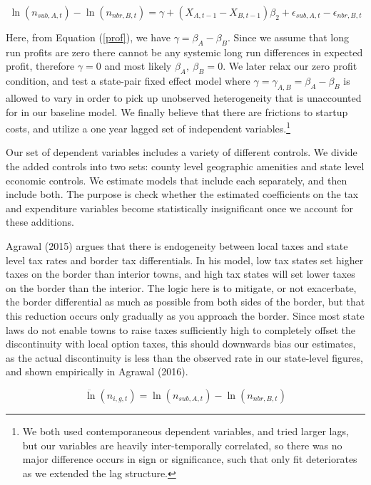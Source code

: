 \documentclass[12pt,a4paper]{article}
\begin{document}
\begin{equation}\label{pref}
\ln(n_{sub,A,t})-\ln(n_{nbr,B,t}) = \gamma+ (X_{A,t-1}-X_{B,t-1})\beta_{2} + \epsilon_{sub,A,t}-\epsilon_{nbr,B,t}
\end{equation}

Here, from Equation (\ref{prof}), we have $\gamma = \beta_{A} - \beta_{B}$. Since we assume that long run profits are zero there cannot be any systemic long run differences in expected profit, therefore $\gamma = 0$ and most likely $\beta_{A},\ \beta_{B} = 0$. We later relax our zero profit condition, and test a state-pair fixed effect model where $\gamma = \gamma_{A,B} = \beta_{A} - \beta_{B}$ is allowed to vary in order to pick up unobserved heterogeneity that is unaccounted for in our baseline model. We finally believe that there are frictions to startup costs, and utilize a one year lagged set of independent variables.\footnote{We both used contemporaneous dependent variables, and tried larger lags, but our variables are heavily inter-temporally correlated, so there was no major difference occurs in sign or significance, such that only fit deteriorates as we extended the lag structure.}

Our set of dependent variables includes a variety of different controls. We divide the added  controls into two sets: county level geographic amenities and state level economic controls. We estimate models that include each separately, and then include both. The purpose is check whether the estimated coefficients on the tax and expenditure variables become statistically insignificant once we account for these additions.

Agrawal (2015) argues that there is endogeneity between local taxes and state level tax rates and border tax differentials. In his model, low tax states set higher taxes on the border than interior towns, and high tax states will set lower taxes on the border than the interior. The logic here is to mitigate, or not exacerbate, the border differential as much as possible from both sides of the border, but that this reduction occurs only gradually as you approach the border. Since most state laws do not enable towns to raise taxes sufficiently high to completely offset the discontinuity with local option taxes, this should downwards bias our estimates, as the actual discontinuity is less than the observed rate in our state-level figures, and shown empirically in Agrawal (2016).

\begin{equation}
\ddot \ln(n_{i,g,t}) = \ln(n_{sub,A,t})-\ln(n_{nbr,B,t})
\end{equation}
\end{document}
